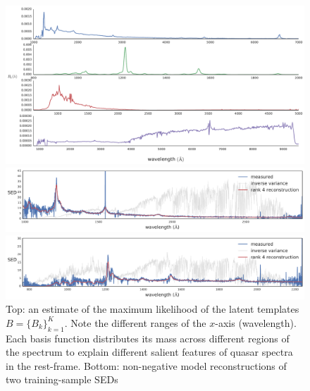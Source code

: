 \documentclass{article}
\begin{document}
\begin{figure}[t]
\vskip 0.2in
\begin{center}
\centerline{\includegraphics[width=2\columnwidth]{../figs/rank_4_basis}}
\centerline{\includegraphics[width=2\columnwidth]{../figs/idx_0_rank_4_reconstruction.pdf}}
\centerline{\includegraphics[width=2\columnwidth]{../figs/idx_4_rank_4_reconstruction.pdf}}
\vskip -0.2in
\caption{Top: an estimate of the maximum likelihood of the latent templates $B = \{B_k\}_{k=1}^K$.  Note the different ranges of the $x$-axis (wavelength).  Each basis function distributes its mass across different regions of the spectrum to explain different salient features of quasar spectra in the rest-frame.  Bottom: non-negative  model reconstructions of two training-sample SEDs }
\label{fig:basis}
\end{center}
\end{figure}
\end{document}
